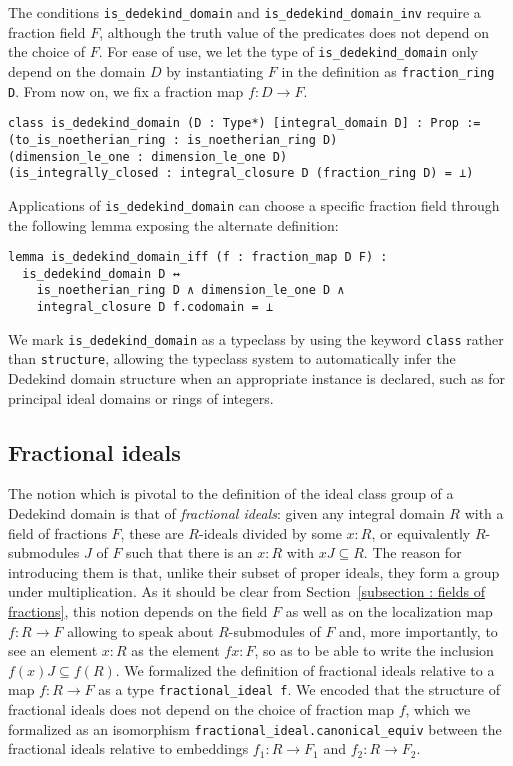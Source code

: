 \documentclass[a4paper,USenglish,cleveref, autoref, thm-restate]{lipics-v2021}
\newcommand{\lean}[1]{\texttt{#1}\xspace} %
\begin{document}
The conditions \lean{is\_dedekind\_domain} and \lean{is\_dedekind\_domain\_inv} require a fraction field $F$,
although the truth value of the predicates does not depend on the choice of $F$.
For ease of use, we let the type of \lean{is\_dedekind\_domain} only depend on the domain $D$
by instantiating $F$ in the definition as \lean{fraction\_ring D}. From now on, we fix a fraction map $f\colon D\to F$.
\begin{lstlisting}
class is_dedekind_domain (D : Type*) [integral_domain D] : Prop :=
(to_is_noetherian_ring : is_noetherian_ring D)
(dimension_le_one : dimension_le_one D)
(is_integrally_closed : integral_closure D (fraction_ring D) = ⊥)
\end{lstlisting}
Applications of \lean{is\_dedekind\_domain} can choose a specific fraction field through the following lemma exposing the alternate definition:
\begin{lstlisting}
lemma is_dedekind_domain_iff (f : fraction_map D F) :
  is_dedekind_domain D ↔
    is_noetherian_ring D ∧ dimension_le_one D ∧
    integral_closure D f.codomain = ⊥
\end{lstlisting}

We mark \lean{is\_dedekind\_domain} as a typeclass by using the keyword \lean{class} rather than \lean{structure},
allowing the typeclass system to automatically infer the Dedekind domain structure when an appropriate instance is declared,
such as for principal ideal domains or rings of integers.

\subsection{Fractional ideals}\label{subsection:frac_ideals}
The notion which is pivotal to the definition of the ideal class group of a Dedekind domain is that of \emph{fractional ideals}: given any integral domain $R$ with a field of fractions $F$, these are $R$-ideals divided by some $x : R$,
or equivalently $R$-submodules $J$ of $F$ such that there is an $x : R$ with $x J \subseteq R$. The reason for introducing them is that, unlike their subset of proper ideals, they form a group under multiplication. As it should be clear from Section~\ref{subsection : fields of fractions}, this notion depends on the field $F$ as well as on the localization map $f\colon R\to F$ allowing to speak about $R$-submodules of $F$ and, more importantly, to see an element $x:R$ as the element $f x : F$, so as to be able to write the inclusion $f(x)J\subseteq f(R)$. We formalized the definition of fractional ideals relative to a map $f\colon R\to F$ as a type \lean{fractional\_ideal f}. 
We encoded that the structure of fractional ideals does not depend on the choice of fraction map $f$,
which we formalized as an isomorphism \lean{fractional\_ideal.canonical\_equiv} between the fractional ideals relative to embeddings $f_1\colon R\to F_1$ and $f_2\colon R\to F_2$.
\end{document}
